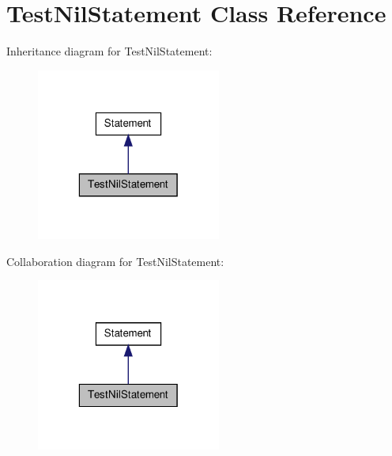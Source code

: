 \hypertarget{class_test_nil_statement}{\section{Test\-Nil\-Statement Class Reference}
\label{class_test_nil_statement}
}


Inheritance diagram for Test\-Nil\-Statement\-:
\nopagebreak
\begin{figure}[H]
\begin{center}
\leavevmode
\includegraphics[width=172pt]{class_test_nil_statement__inherit__graph}
\end{center}
\end{figure}


Collaboration diagram for Test\-Nil\-Statement\-:
\nopagebreak
\begin{figure}[H]
\begin{center}
\leavevmode
\includegraphics[width=172pt]{class_test_nil_statement__coll__graph}
\end{center}
\end{figure}
